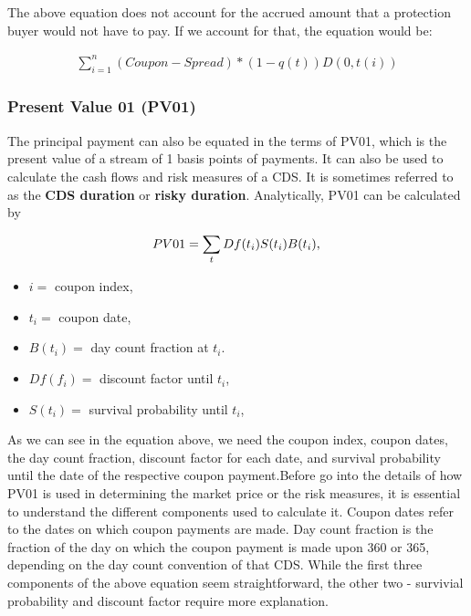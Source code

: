 \documentclass[article]{jss}
\begin{document}
The above equation does not account for the accrued amount that a protection buyer would not have to pay. If we account for that, the equation would be:

\begin{equation}
 \begin{aligned}
   \displaystyle\sum_{i=1}^{n}(Coupon - Spread)*(1-q(t)) D(0, t(i))
    \end{aligned}
\end{equation}

\subsubsection{Present Value 01 (PV01)}
\label{sec:PV01}

The principal payment can also be equated in the terms of PV01, which is the present value of a stream of 1 basis points of payments. It can also be used to calculate the cash flows and risk measures of a CDS. It is sometimes referred to as the \textbf{CDS duration} or \textbf{risky duration}. Analytically, PV01 can be calculated by

\begin{displaymath}
PV01 =  \sum_tDf(t_i)S(t_i)B(t_i), \nonumber\\
\end{displaymath}
\begin{itemize}
\item $i =$ coupon index,
\item $t_i =$ coupon date,
\item $B(t_i) =$ day count fraction at $t_i$.
\item $Df(f_i) =$ discount factor until $t_i$,
\item $S(t_i) =$ survival probability until $t_i$,
\end{itemize}

As we can see in the equation above, we need the coupon index, coupon dates, the day count fraction, discount factor for each date, and survival probability until the date of the respective coupon payment.Before go into the details of how PV01 is used in determining the market price or the risk measures, it is essential to understand the different components used to calculate it. Coupon dates refer to the dates on which coupon payments are made. Day count fraction is the fraction of the day on which the coupon payment is made upon 360 or 365, depending on the day count convention of that CDS. While the first three components of the above equation seem straightforward, the other two - survivial probability and discount factor require more explanation.
\end{document}
